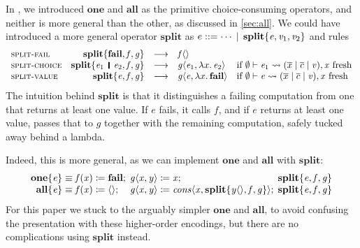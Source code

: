 \documentclass[acmsmall,review,anonymous,dvipsnames]{acmart}
\newcommand{\Varid}[1]{\mathit{#1}}
\begin{document}
In \versecalc{}, we introduced \ensuremath{\textbf{one}} and \ensuremath{\textbf{all}} as the primitive choice-consuming operators, and neither is more general than the other, as discussed in \cref{sec:all}. We could have introduced a more general operator \ensuremath{\textbf{split}} as $e ::=  \ensuremath{\cdots} \vb \ensuremath{\textbf{split}\{\Varid{e},\Varid{v}_{\mathrm{1}},\Varid{v}_{\mathrm{2}}\}}$ and rules
\[\begin{array}{lrcll}
    \rulename{split-fail} & \ensuremath{\textbf{split}\{\textbf{fail},\Varid{f},\Varid{g}\}} & \movesto & \ensuremath{\Varid{f}\langle\rangle} \\
    \rulename{split-choice} & \ensuremath{\textbf{split}\{\Varid{e}_{\mathrm{1}}\hspace{1mm}\mathop{\rule[-0.3mm]{0.5mm}{2.5mm}}\hspace{1mm}\Varid{e}_{\mathrm{2}},\Varid{f},\Varid{g}\}} & \movesto & \ensuremath{\Varid{g}\langle\Varid{e}_{\mathrm{1}},\lambda x.\,\Varid{e}_{\mathrm{2}}\rangle} & \text{if } \wff{\emptyset}{\ensuremath{\Varid{e}_{\mathrm{1}}}}{\ensuremath{\overline{x}}}{\ensuremath{\overline{c}}}{\ensuremath{\Varid{v}}}, \text{\ensuremath{\Varid{x}} fresh}  \\
    \rulename{split-value} & \ensuremath{\textbf{split}\{\Varid{e},\Varid{f},\Varid{g}\}} & \movesto & \ensuremath{\Varid{g}\langle\Varid{e},\lambda x.\,\textbf{fail}\rangle} & \text{if } \wff{\emptyset}{\ensuremath{\Varid{e}}}{\ensuremath{\overline{x}}}{\ensuremath{\overline{c}}}{\ensuremath{\Varid{v}}}, \text{\ensuremath{\Varid{x}} fresh}  \\
\end{array}\]
The intuition behind \ensuremath{\textbf{split}} is that it distinguishes a failing computation from one that returns at least one value. If \ensuremath{\Varid{e}} fails, it calls \ensuremath{\Varid{f}}, and if \ensuremath{\Varid{e}} returns at least one value, passes that to \ensuremath{\Varid{g}} together with the remaining computation, safely tucked away behind a lambda.

Indeed, this is more general, as we can implement \ensuremath{\textbf{one}} and \ensuremath{\textbf{all}} with \ensuremath{\textbf{split}}:
\[\begin{array}{r@{\;}l@{\;}l@{\;}l}
    \ensuremath{\textbf{one}\{\Varid{e}\}} & \equiv \ensuremath{\Varid{f}(\Varid{x})\mathrel{\coloneqq}\textbf{fail};\,} & \ensuremath{\Varid{g}\langle\Varid{x},\Varid{y}\rangle\mathrel{\coloneqq}\Varid{x};\,} & \ensuremath{\textbf{split}\{\Varid{e},\Varid{f},\Varid{g}\}} \\
    \ensuremath{\textbf{all}\{\Varid{e}\}} & \equiv \ensuremath{\Varid{f}(\Varid{x})\mathrel{\coloneqq}\langle\rangle;\,}    & \ensuremath{\Varid{g}\langle\Varid{x},\Varid{y}\rangle\mathrel{\coloneqq}\Varid{cons}\langle\Varid{x},\textbf{split}\{\Varid{y}\langle\rangle,\Varid{f},\Varid{g}\}\rangle;\,} & \ensuremath{\textbf{split}\{\Varid{e},\Varid{f},\Varid{g}\}}
\end{array}\]
For this paper we stuck to the arguably simpler \ensuremath{\textbf{one}} and \ensuremath{\textbf{all}},
to avoid confusing the presentation with these higher-order encodings, but there are no complications using \ensuremath{\textbf{split}} instead.
\end{document}
